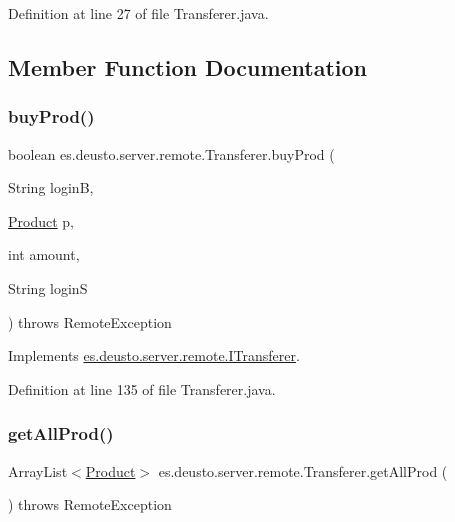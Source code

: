 Definition at line 27 of file Transferer.\+java.



\subsection{Member Function Documentation}
\mbox{\label{classes_1_1deusto_1_1server_1_1remote_1_1_transferer_ad5868dd67ee9a53e7cdf0c30e08a3a1b}} 
\subsubsection{\texorpdfstring{buy\+Prod()}{buyProd()}}
{\footnotesize\ttfamily boolean es.\+deusto.\+server.\+remote.\+Transferer.\+buy\+Prod (\begin{DoxyParamCaption}\item[{String}]{loginB,  }\item[{\hyperlink{classes_1_1deusto_1_1server_1_1db_1_1data_1_1_product}{Product}}]{p,  }\item[{int}]{amount,  }\item[{String}]{loginS }\end{DoxyParamCaption}) throws Remote\+Exception}



Implements \hyperlink{interfacees_1_1deusto_1_1server_1_1remote_1_1_i_transferer_a86d92e8a78257551122807ae02259950}{es.\+deusto.\+server.\+remote.\+I\+Transferer}.



Definition at line 135 of file Transferer.\+java.

\mbox{\label{classes_1_1deusto_1_1server_1_1remote_1_1_transferer_a29cbb75edeb4e0973780fd379ef2b3fb}} 
\subsubsection{\texorpdfstring{get\+All\+Prod()}{getAllProd()}}
{\footnotesize\ttfamily Array\+List$<$\hyperlink{classes_1_1deusto_1_1server_1_1db_1_1data_1_1_product}{Product}$>$ es.\+deusto.\+server.\+remote.\+Transferer.\+get\+All\+Prod (\begin{DoxyParamCaption}{ }\end{DoxyParamCaption}) throws Remote\+Exception}



